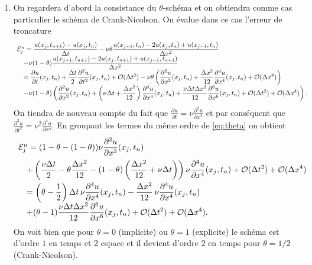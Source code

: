 \documentclass[12pt,a4paper]{article}
\begin{document}
\begin{enumerate}
\item On regardera d'abord la consistance du
  $\theta$-sch\'ema et on obtiendra comme cas particulier le sch\'ema de Crank-Nicolson. On \'evalue dans ce cas l'erreur de troncature
\begin{equation}\label{eq:theta}
\begin{array}{l}
{\cal E}^n_j=\displaystyle \frac{u(x_j,t_{n+1})-u(x_j,t_n)}{\Delta t} -\displaystyle \nu\theta
\frac{u(x_{j+1},t_n)-2u(x_j,t_n)+u(x_{j-1},t_n)}{\Delta  x^2}\\
\quad-\displaystyle \nu (1-\theta) \frac{u(x_{j+1},t_{n+1})-2u(x_j,t_{n+1})+u(x_{j-1},t_{n+1})}{\Delta
  x^2}\\
\quad = \displaystyle\frac{\partial u}{\partial t}(x_j,t_n) + \frac{\Delta t}{2}
\frac{\partial^2 u}{\partial t^2}(x_j,t_n)+{\cal O}(\Delta t^2)-\displaystyle\nu\theta \left( \frac{\partial^2 u}{\partial
    x^2}(x_j,t_n)+\frac{\Delta x^2}{12}\frac{\partial^4 u}{\partial
    x^4}(x_j,t_n)+{\cal O}(\Delta x^4)\right)\\
\quad -\displaystyle\nu(1-\theta) \left( \frac{\partial^2 u}{\partial
  x^2}(x_j,t_n)+\left(\nu\Delta t+ \frac{\Delta x^2}{12}\right) \frac{\partial^4 u}{\partial
  x^4}(x_j,t_n)+\frac{\nu\Delta t \Delta x^2}{12}\frac{\partial^6 u}{\partial
  x^6}(x_j,t_n) +{\cal O}(\Delta t^2) +{\cal O}(\Delta x^4)\right).
\end{array}
\end{equation}
On tiendra de nouveau compte du fait que $\frac{\partial u}{\partial t} = \nu
\frac{\partial^2 u}{\partial x^2}$ et par cons\'equent que $\frac{\partial^2 u}{\partial t^2} = \nu^2
\frac{\partial^4 u}{\partial x^4}$. En groupant les termes du m\^eme
ordre de \eqref{eq:theta} on obtient
$$
\begin{array}{l}
{\cal E}^n_j =\displaystyle (1-\theta -(1-\theta))\nu\frac{\partial^2
  u}{\partial x^2}(x_j,t_n)\\[2ex]
\quad +\displaystyle\left(\frac{\nu\Delta t}{2} -\theta \frac{\Delta x^2}{12}
  -(1-\theta)\left(\frac{\Delta x^2}{12}+\nu\Delta t\right)\right) \nu\frac{\partial^4
  u}{\partial x^4}(x_j,t_n)+{\cal O}(\Delta t^2) +{\cal O}(\Delta
x^4)\\[2ex]
\quad =\displaystyle\left(\theta-\frac{1}{2}\right) \Delta t\,\nu\frac{\partial^4
  u}{\partial x^4}(x_j,t_n)-\frac{\Delta x^2}{12}\,\nu\frac{\partial^4
  u}{\partial x^4}(x_j,t_n) \\
\quad \displaystyle+(\theta-1) \frac{\nu\Delta t \Delta x^2}{12}\frac{\partial^6 u}{\partial
  x^6}(x_j,t_n)+ {\cal O}(\Delta t^2) +{\cal O}(\Delta
x^4).
\end{array}
$$
On voit bien que pour $\theta=0$ (implicite) ou $\theta=1$
(explicite) le sch\'ema est d'ordre $1$ en temps et $2$ espace et il
devient d'ordre $2$ en temps pour $\theta=1/2$ (Crank-Nicolson).


\end{enumerate}
\end{document}
